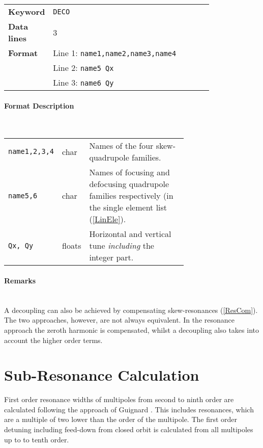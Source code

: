 \bigskip
\begin{tabular}{@{}lp{0.8\linewidth}}
    \textbf{Keyword}    & \texttt{DECO} \\
    \textbf{Data lines} & 3 \\
    \textbf{Format}     & Line 1: \texttt{name1,name2,name3,name4} \\
                        & Line 2: \texttt{name5 Qx} \\
                        & Line 3: \texttt{name6 Qy}
\end{tabular}

\paragraph{Format Description}~

\bigskip
\begin{tabular}{@{}llp{0.70\linewidth}}
    \texttt{name1,2,3,4} & char   & Names of the four skew-quadrupole families. \\
    \texttt{name5,6}     & char   & Names of focusing and defocusing quadrupole families respectively (in the single element list (\ref{LinEle}). \\
    \texttt{Qx, Qy}      & floats & Horizontal and vertical tune \emph{including} the integer part.
\end{tabular}

\paragraph{Remarks}~\\

A decoupling can also be achieved by compensating skew-resonances (\ref{ResCom}).
The two approaches, however, are not always equivalent.
In the resonance approach the zeroth harmonic is compensated, whilst a decoupling also takes into account the higher order terms.

\section{Sub-Resonance Calculation} \label{SubCal}

First order resonance widths of multipoles from second to ninth order are calculated following the approach of Guignard \cite{Gilbert78}.
This includes resonances, which are a multiple of two lower than the order of the multipole.
The first order detuning including feed-down from closed orbit is calculated from all multipoles up to to tenth order.

